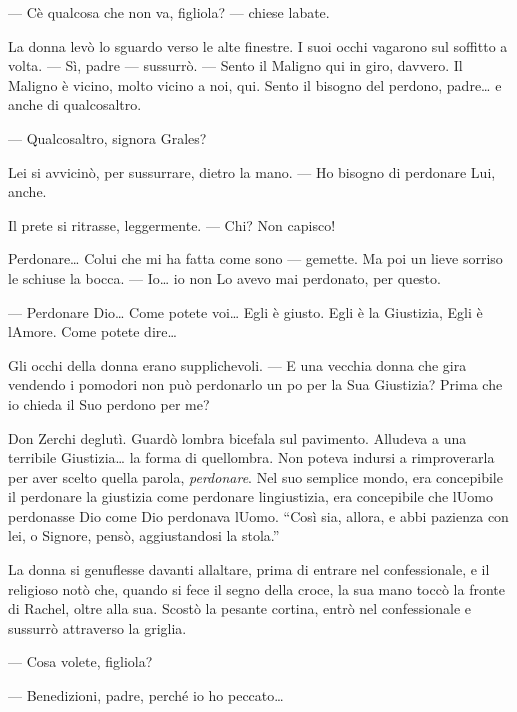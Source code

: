 --- C\textquotesingle è qualcosa che non va, figliola? --- chiese
l\textquotesingle abate.

La donna levò lo sguardo verso le alte finestre. I suoi occhi vagarono
sul soffitto a volta. --- Sì, padre --- sussurrò. --- Sento il Maligno
qui in giro, davvero. Il Maligno è vicino, molto vicino a noi, qui.
Sento il bisogno del perdono, padre\ldots{} e anche di
qualcos\textquotesingle altro.

--- Qualcos\textquotesingle altro, signora Grales?

Lei si avvicinò, per sussurrare, dietro la mano. --- Ho bisogno di
perdonare Lui, anche.

Il prete si ritrasse, leggermente. --- Chi? Non capisco!

Perdonare\ldots{} Colui che mi ha fatta come sono --- gemette. Ma poi un
lieve sorriso le schiuse la bocca. --- Io\ldots{} io non Lo avevo mai
perdonato, per questo.

--- Perdonare Dio\ldots{} Come potete voi\ldots{} Egli è giusto. Egli è
la Giustizia, Egli è l\textquotesingle Amore. Come potete dire\ldots{}

Gli occhi della donna erano supplichevoli. --- E una vecchia donna che
gira vendendo i pomodori non può perdonarlo un po\textquotesingle{} per
la Sua Giustizia? Prima che io chieda il Suo perdono per me?

Don Zerchi deglutì. Guardò l\textquotesingle ombra bicefala sul
pavimento. Alludeva a una terribile Giustizia\ldots{} la forma di
quell\textquotesingle ombra. Non poteva indursi a rimproverarla per aver
scelto quella parola, \emph{perdonare}. Nel suo semplice mondo, era
concepibile il perdonare la giustizia come perdonare
l\textquotesingle ingiustizia, era concepibile che
l\textquotesingle Uomo perdonasse Dio come Dio perdonava
l\textquotesingle Uomo. ``Così sia, allora, e abbi pazienza con lei, o
Signore, pensò, aggiustandosi la stola.''

La donna si genuflesse davanti all\textquotesingle altare, prima di
entrare nel confessionale, e il religioso notò che, quando si fece il
segno della croce, la sua mano toccò la fronte di Rachel, oltre alla
sua. Scostò la pesante cortina, entrò nel confessionale e sussurrò
attraverso la griglia.

--- Cosa volete, figliola?

--- Benedizioni, padre, perché io ho peccato\ldots{}


